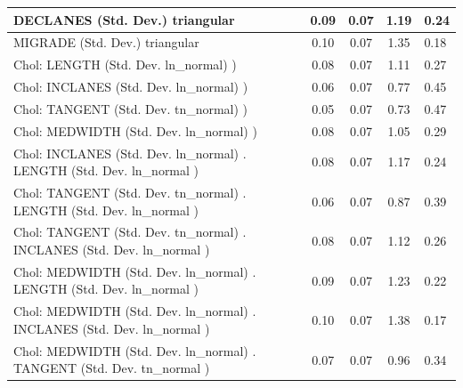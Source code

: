 \begin{table}
\begin{center}
\begin{tabular}{|l|l|c|c|c|l|}
			\hline
			DECLANES (Std. Dev.) triangular &  & 0.09 & 0.07 & 1.19 & 0.24 \\
			\hline
			MIGRADE (Std. Dev.) triangular &  & 0.10 & 0.07 & 1.35 & 0.18 \\
			\hline
			 Chol: LENGTH (Std. Dev. ln_normal) ) &  & 0.08 & 0.07 & 1.11 & 0.27 \\
			\hline
			 Chol: INCLANES (Std. Dev. ln_normal) ) &  & 0.06 & 0.07 & 0.77 & 0.45 \\
			\hline
			 Chol: TANGENT (Std. Dev. tn_normal) ) &  & 0.05 & 0.07 & 0.73 & 0.47 \\
			\hline
			 Chol: MEDWIDTH (Std. Dev. ln_normal) ) &  & 0.08 & 0.07 & 1.05 & 0.29 \\
			\hline
			 Chol: INCLANES (Std. Dev. ln_normal) . LENGTH (Std. Dev.   ln_normal ) &  & 0.08 & 0.07 & 1.17 & 0.24 \\
			\hline
			 Chol: TANGENT (Std. Dev. tn_normal) . LENGTH (Std. Dev.   ln_normal ) &  & 0.06 & 0.07 & 0.87 & 0.39 \\
			\hline
			 Chol: TANGENT (Std. Dev. tn_normal) . INCLANES (Std. Dev.   ln_normal ) &  & 0.08 & 0.07 & 1.12 & 0.26 \\
			\hline
			 Chol: MEDWIDTH (Std. Dev. ln_normal) . LENGTH (Std. Dev.   ln_normal ) &  & 0.09 & 0.07 & 1.23 & 0.22 \\
			\hline
			 Chol: MEDWIDTH (Std. Dev. ln_normal) . INCLANES (Std. Dev.   ln_normal ) &  & 0.10 & 0.07 & 1.38 & 0.17 \\
			\hline
			 Chol: MEDWIDTH (Std. Dev. ln_normal) . TANGENT (Std. Dev.   tn_normal ) &  & 0.07 & 0.07 & 0.96 & 0.34 \\
			\hline
		\end{tabular}
	\end{center}
\end{table}